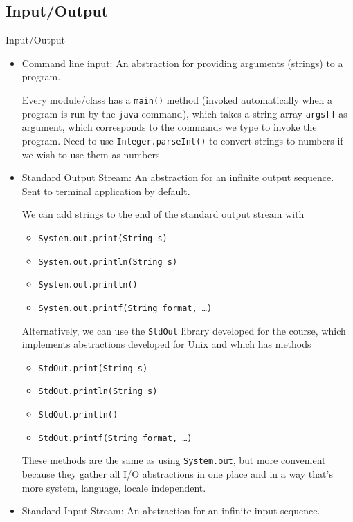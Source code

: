 \documentclass[12pt]{article}
\theoremstyle{plain}
\theoremstyle{definition}
\theoremstyle{remark}
\begin{document}
\clearpage
\subsection{Input/Output}
Input/Output
\begin{itemize}
  \item Command line input: An abstraction for providing arguments
    (strings) to a program.

    Every module/class has a \texttt{main()} method (invoked
    automatically when a program is run by the \texttt{java}
    command), which takes a string array \texttt{args[]} as
    argument, which corresponds to the commands we type to invoke
    the program.  Need to use \texttt{Integer.parseInt()} to convert
    strings to numbers if we wish to use them as numbers.

  \item Standard Output Stream:
    An abstraction for an infinite output sequence.
    Sent to terminal application by default.

    We can add strings to the end of the standard output stream with
    \begin{itemize}
      \item \texttt{System.out.print(String s)}
      \item \texttt{System.out.println(String s)}
      \item \texttt{System.out.println()}
      \item \texttt{System.out.printf(String format, \dots)}
    \end{itemize}
    Alternatively, we can use the \texttt{StdOut} library developed for
    the course, which implements abstractions developed for Unix and
    which has methods
    \begin{itemize}
      \item \texttt{StdOut.print(String s)}
      \item \texttt{StdOut.println(String s)}
      \item \texttt{StdOut.println()}
      \item \texttt{StdOut.printf(String format, \dots)}
    \end{itemize}
    These methods are the same as using \texttt{System.out}, but more
    convenient because they gather all I/O abstractions in one place
    and in a way that's more system, language, locale independent.

  \item
    Standard Input Stream:
    An abstraction for an infinite input sequence.


\end{itemize}
\end{document}
